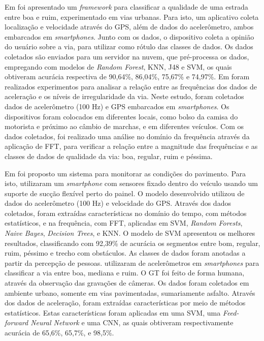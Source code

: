 Em \cite{Nunes2019} foi apresentado um \textit{framework} para classificar a qualidade de uma estrada entre boa e ruim, experimentado em vias urbanas. Para isto, um aplicativo coleta localização e velocidade através do GPS, além de dados do acelerômetro, ambos embarcados em \textit{smartphones}. Junto com os dados, o dispositivo coleta a opinião do usuário sobre a via, para utilizar como rótulo das classes de dados. Os dados coletados são enviados para um servidor na nuvem, que pré-processa os dados, empregando com modelos de \textit{Random Forest}, KNN, J48 e SVM, os quais obtiveram acurácia respectiva de 90,64\%, 86,04\%, 75,67\% e 74,97\%. Em \cite{Douangphachanh2014_1} foram realizados experimentos para analisar a relação entre as frequências dos dados de aceleração e os níveis de irregularidade da via. Neste estudo, foram coletados dados de acelerômetro (100 Hz) e GPS embarcados em \textit{smartphones}. Os dispositivos foram colocados em diferentes locais, como bolso da camisa do motorista e próximo ao câmbio de marchas, e em diferentes veículos. Com os dados coletados, foi realizado uma análise no domínio da frequência através da aplicação de FFT, para verificar a relação entre a magnitude das frequências e as classes de dados de qualidade da via: boa, regular, ruim e péssima.

Em \cite{Souza2018_1} foi proposto um sistema para monitorar as condições do pavimento. Para isto, utilizaram um \textit{smartphone} com sensores fixado dentro do veículo usando um suporte de sucção flexível perto do painel. O modelo desenvolvido utilizou de dados do acelerômetro (100 Hz) e velocidade do GPS. Através dos dados coletados, foram extraídas características no domínio do tempo, com métodos estatísticos, e na frequência, com FFT, aplicadas em SVM, \textit{Random Forests}, \textit{Naive Bayes}, \textit{Decision Trees}, e KNN. O modelo de SVM apresentou os melhores resultados, classificando com 92,39\% de acurácia os segmentos entre bom, regular, ruim, péssimo e trecho com obstáculos. As classes de dados foram anotadas a partir da percepção de pessoas. \cite{Tiwari2020} utilizaram de acelerômetros em \textit{smartphones} para classificar a via entre boa, mediana e ruim. O GT foi feito de forma humana, através da observação das gravações de câmeras. Os dados foram coletados em ambiente urbano, somente em vias pavimentadas, sumariamente asfalto. Através dos dados de aceleração, foram extraídas características por meio de métodos estatísticos. Estas características foram aplicadas em uma SVM, uma \textit{Feed-forward Neural Network} e uma CNN, as quais obtiveram respectivamente acurácia de 65,6\%, 65,7\%, e 98,5\%.

